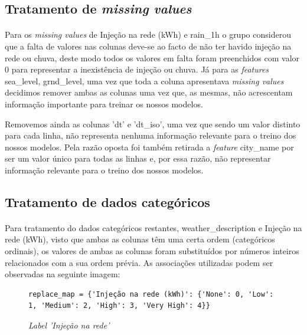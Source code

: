 \subsection{Tratamento de \textit{missing values}}
\paragraph{}
Para os \textit{missing values} de Injeção na rede (kWh) e rain\_1h o grupo considerou que a falta de valores nas colunas deve-se ao facto de não ter havido injeção na rede ou chuva, deste modo todos os valores em falta foram preenchidos com valor 0 para representar a inexistência de injeção ou chuva.
Já para as \textit{features} sea\_level, grnd\_level, uma vez que toda a coluna apresentava \textit{missing values} decidimos remover ambas as colunas uma vez que, as mesmas, não acrescentam informação importante para treinar os nossos modelos.

Removemos ainda as colunas 'dt' e 'dt\_iso', uma vez que sendo um valor distinto para cada linha, não representa nenhuma informação relevante para o treino dos nossos modelos. Pela razão oposta foi também retirada a \textit{feature} city\_name por ser um valor único para todas as linhas e, por essa razão, não representar informação relevante para o treino dos nossos modelos.

\subsection{Tratamento de dados categóricos}
\paragraph{}
Para tratamento do dados categóricos restantes, weather\_description e Injeção na rede (kWh), visto que ambas as colunas têm uma certa ordem (categóricos ordinais), os valores de ambas as colunas foram substituídos por números inteiros relacionados com a sua ordem prévia.
As associações utilizadas podem ser observadas na seguinte imagem:

\begin{figure}[H]
    \centering
    \begin{verbatim}
replace_map = {'Injeção na rede (kWh)': {'None': 0, 'Low': 1, 'Medium': 2, 'High': 3, 'Very High': 4}}
    \end{verbatim}
    \caption{\textit{Label 'Injeção na rede'}}
    \label{fig1}
\end{figure}

